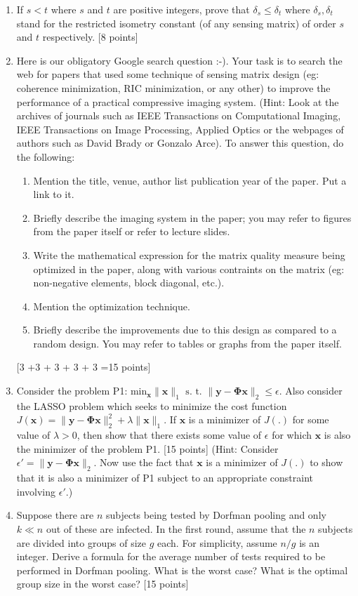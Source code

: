 \documentclass[11pt]{article}
\begin{document}
\begin{enumerate}
\item If $s < t$ where $s$ and $t$ are positive integers, prove that $\delta_s \leq \delta_t$ where $\delta_s, \delta_t$ stand for the restricted isometry constant (of any sensing matrix) of order $s$ and $t$ respectively. \textsf{[8 points]}

\item Here is our obligatory Google search question :-). Your task is to search the web for papers that used some technique of sensing matrix design (eg: coherence minimization, RIC minimization, or any other) to improve the performance of a practical compressive imaging system. (Hint: Look at the archives of journals such as IEEE Transactions on Computational Imaging, IEEE Transactions on Image Processing, Applied Optics or the webpages of authors such as David Brady or Gonzalo Arce). To answer this question, do the following:
\begin{enumerate}
\item Mention the title, venue, author list publication year of the paper. Put a link to it.
\item Briefly describe the imaging system in the paper; you may refer to figures from the paper itself or refer to lecture slides.
\item Write the mathematical expression for the matrix quality measure being optimized in the paper, along with various contraints on the matrix (eg: non-negative elements, block diagonal, etc.).
\item Mention the optimization technique. 
\item Briefly describe the improvements due to this design as compared to a random design. You may refer to tables or graphs from the paper itself. 
\end{enumerate} \textsf{[3 +3 + 3 + 3 + 3 =15 points]}

\item Consider the problem P1: $\textrm{min}_{\boldsymbol{x}} \|\boldsymbol{x}\|_1 \textrm{ s. t. } \|\boldsymbol{y}-\boldsymbol{\Phi x}\|_2 \leq \epsilon$. Also consider the LASSO problem which seeks to minimize the cost function $J(\boldsymbol{x}) = \|\boldsymbol{y}-\boldsymbol{\Phi x}\|^2_2 + \lambda \|\boldsymbol{x}\|_1$. If $\boldsymbol{x}$ is a minimizer of $J(.)$ for some value of $\lambda > 0$, then show that there exists some value of $\epsilon$ for which $\boldsymbol{x}$ is also the minimizer of the problem P1. \textsf{[15 points]} (Hint: Consider $\epsilon' = \|\boldsymbol{y} - \boldsymbol{\Phi x}\|_2$. Now use the fact that $\boldsymbol{x}$ is a minimizer of $J(.)$ to show that it is also a minimizer of P1 subject to an appropriate constraint involving $\epsilon'$.)

\item Suppose there are $n$ subjects being tested by Dorfman pooling and only $k \ll n$ out of these are infected. In the first round, assume that the $n$ subjects are divided into groups of size $g$ each. For simplicity, assume $n/g$ is an integer. Derive a formula for the average number of tests required to be performed in Dorfman pooling. What is the worst case? What is the optimal group size in the worst case? \textsf{[15 points]}

\end{enumerate}
\end{document}
